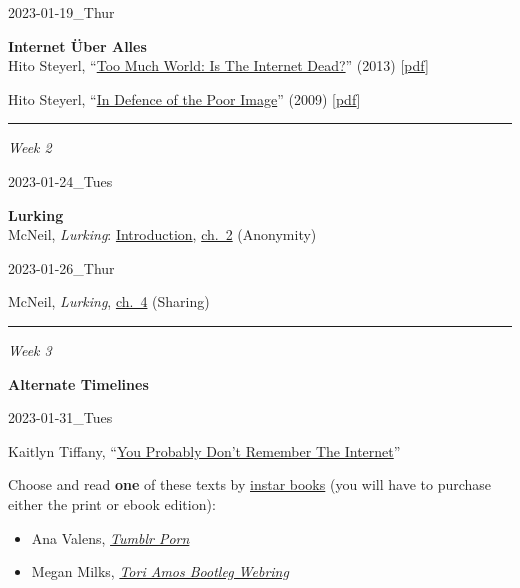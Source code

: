 \documentclass[
  letterpaper,
  DIV=11,
  numbers=noendperiod]{scrartcl}
\providecommand{\tightlist}{%
  \setlength{\itemsep}{0pt}\setlength{\parskip}{0pt}}\usepackage{longtable,booktabs,array}
\begin{document}
2023-01-19\_Thur

\textbf{Internet Über Alles}\\
Hito Steyerl,
``\href{https://www.e-flux.com/journal/49/60004/too-much-world-is-the-internet-dead/}{Too
Much World: Is The Internet Dead?}'' (2013)
{[}\href{https://canvas.emerson.edu/courses/1932613/files/144544369?wrap=1}{pdf}{]}

Hito Steyerl,
``\href{https://www.e-flux.com/journal/10/61362/in-defense-of-the-poor-image/}{In
Defence of the Poor Image}'' (2009)
{[}\href{https://canvas.emerson.edu/courses/1932613/files/144727898?wrap=1}{pdf}{]}

\begin{center}\rule{0.5\linewidth}{0.5pt}\end{center}

\emph{Week 2}

2023-01-24\_Tues

\textbf{Lurking}\\
McNeil, \emph{Lurking}:
\href{https://canvas.emerson.edu/courses/1932613/files/144549946?wrap=1}{Introduction},
\href{https://canvas.emerson.edu/courses/1932613/files/144549950?wrap=1}{ch.~2}
(Anonymity)

2023-01-26\_Thur

McNeil, \emph{Lurking},
\href{https://canvas.emerson.edu/courses/1932613/files/144549949?wrap=1}{ch.~4}
(Sharing)

\begin{center}\rule{0.5\linewidth}{0.5pt}\end{center}

\emph{Week 3}

\textbf{Alternate Timelines}

2023-01-31\_Tues

Kaitlyn Tiffany,
``\href{https://canvas.emerson.edu/courses/1932613/files/145219877?wrap=1}{You
Probably Don't Remember The Internet}''

Choose and read \textbf{one} of these texts by
\href{http://www.instarbooks.com/remember-the-internet.html}{instar
books} (you will have to purchase either the print or ebook edition):

\begin{itemize}
\tightlist
\item
  Ana Valens,
  \href{http://www.instarbooks.com/books/tumblr-porn.html}{\emph{Tumblr
  Porn}}
\item
  Megan Milks,
  \href{http://www.instarbooks.com/books/tori-amos-bootleg-webring.html}{\emph{Tori
  Amos Bootleg Webring}}
\end{itemize}
\end{document}
